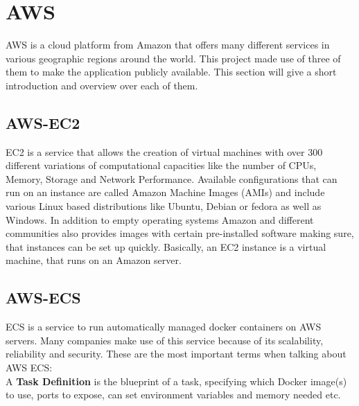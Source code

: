 \section{AWS}
AWS is a cloud platform from Amazon that offers many different services in various geographic regions around the world. This project made use of three of them to make the application publicly available. This section will give a short introduction and overview over each of them.

\subsection{AWS-EC2}
EC2 is a service that allows the creation of virtual machines with over 300 different variations of computational capacities like the number of CPUs, Memory, Storage and Network Performance. \cite{AwsEc2} 
Available configurations that can run on an instance are called Amazon Machine Images (AMIs) and include various Linux based distributions like Ubuntu, Debian or fedora as well as Windows. In addition to empty operating systems Amazon and different communities also provides images with certain pre-installed software making sure, that instances can be set up quickly.
Basically, an EC2 instance is a virtual machine, that runs on an Amazon server. \cite{Ec2VirtualMachine}

\newpage
\subsection{AWS-ECS}
ECS is a service to run automatically managed docker containers on AWS servers. Many companies make use of this service because of its scalability, reliability and security. \cite{AwsEc2}
These are the most important terms when talking about AWS ECS: \\

A \textbf{Task Definition} is the blueprint of a task, specifying which Docker image(s) to use, ports to expose, can set environment variables and memory needed etc. \cite{CodeCampEcs}

